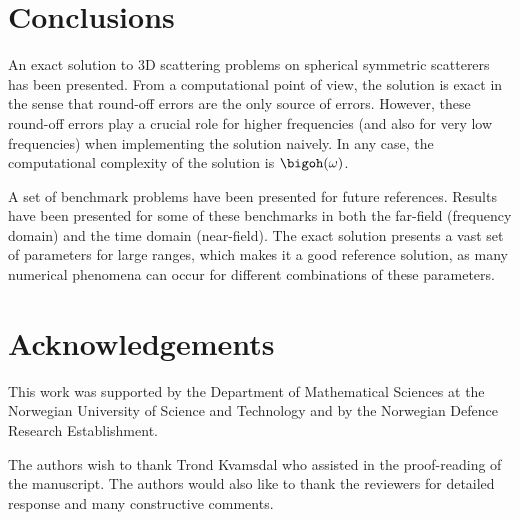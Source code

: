 \newpage
\section{Conclusions}
\label{Sec1:conclusions}
An exact solution to 3D scattering problems on spherical symmetric scatterers has been presented. From a computational point of view, the solution is exact in the sense that round-off errors are the only source of errors. However, these round-off errors play a crucial role for higher frequencies (and also for very low frequencies) when implementing the solution naively. In any case, the computational complexity of the solution is $\bigoh(\omega)$.

A set of benchmark problems have been presented for future references. Results have been presented for some of these benchmarks in both the far-field (frequency domain) and the time domain (near-field). The exact solution presents a vast set of parameters for large ranges, which makes it a good reference solution, as many numerical phenomena can occur for different combinations of these parameters.

\section*{Acknowledgements}
This work was supported by the Department of Mathematical Sciences at the Norwegian University of Science and Technology and by the Norwegian Defence Research Establishment. 

The authors wish to thank Trond Kvamsdal who assisted in the proof-reading of the manuscript. The authors would also like to thank the reviewers for detailed response and many constructive comments.